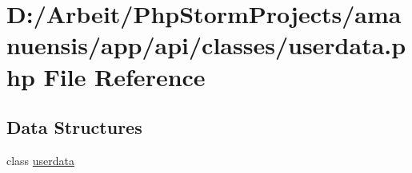 \hypertarget{a00079}{}\section{D\+:/\+Arbeit/\+Php\+Storm\+Projects/amanuensis/app/api/classes/userdata.php File Reference}
\label{a00079}
\subsection*{Data Structures}
\begin{DoxyCompactItemize}
\item 
class \hyperlink{a00050}{userdata}
\end{DoxyCompactItemize}
